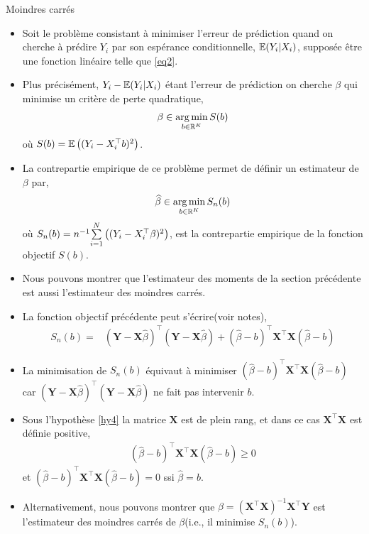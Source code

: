 \begin{frame}[allowframebreaks]{Moindres carrés}
\begin{itemize}
\item Soit le problème consistant à minimiser l'erreur de prédiction quand on cherche à prédire $Y_i$ par son espérance conditionnelle, $\mathbb{E}(Y_i|X_i)$, supposée être une fonction linéaire telle que \eqref{eq2}. 
\item Plus précisément, $Y_i - \mathbb{E}(Y_i|X_i)$ étant l'erreur de prédiction  on cherche $\beta$ qui minimise un critère de perte quadratique,
\begin{align*}
\beta \in \argmin_{b\in \mathbb{R}^K}S(b)
\end{align*}
où $S(b) =\mathbb{E}\left((Y_i - X_i^\top b)^2\right)$.
\item La contrepartie empirique de ce problème permet de définir un estimateur de $\beta$ par,
\begin{align*}
\widehat{\beta} \in \argmin_{b\in \mathbb{R}^K}S_n(b)
\end{align*}
où $S_n(b)=n^{-1}\underset{i=1}{\overset{N}{\sum}}\left((Y_i - X_i^\top\beta)^2\right)$, est la contrepartie empirique de la fonction objectif $S(b)$.
\item Nous pouvons montrer que l'estimateur des moments de la section précédente est aussi l'estimateur des moindres carrés.
\item  La fonction objectif précédente peut s'écrire(voir notes),
\begin{align*}
S_n(b) = &(\mathbf{Y} - \mathbf{X}\widehat{\beta})^\top(\mathbf{Y} - \mathbf{X}\widehat{\beta}) + (\widehat{\beta}-b)^\top \mathbf{X}^\top\mathbf{X} (\widehat{\beta}-b) 
\end{align*}
\item La minimisation de $S_n(b)$ équivaut à minimiser $(\widehat{\beta}-b)^\top \mathbf{X}^\top\mathbf{X} (\widehat{\beta}-b)$ car $(\mathbf{Y} - \mathbf{X}\widehat{\beta})^\top(\mathbf{Y} - \mathbf{X}\widehat{\beta})$ ne fait pas intervenir $b$.  
\item Sous l'hypothèse \ref{hy4} la matrice $\mathbf{X}$ est de plein rang, et dans ce cas $\mathbf{X}^\top\mathbf{X}$ est définie positive,
\begin{align*}
(\widehat{\beta}-b)^\top \mathbf{X}^\top\mathbf{X} (\widehat{\beta}-b) \geq 0
\end{align*}
et $(\widehat{\beta}-b)^\top \mathbf{X}^\top\mathbf{X} (\widehat{\beta}-b) = 0$ ssi $\widehat{\beta} = b$.
\item Alternativement, nous pouvons montrer que $\widehat{\beta}=(\mathbf{X}^\top\mathbf{X})^{-1}\mathbf{X}^\top\mathbf{Y}$ est l'estimateur des moindres carrés de $\beta$(i.e., il minimise $S_n(b)$). 

\end{itemize}
\end{frame}
